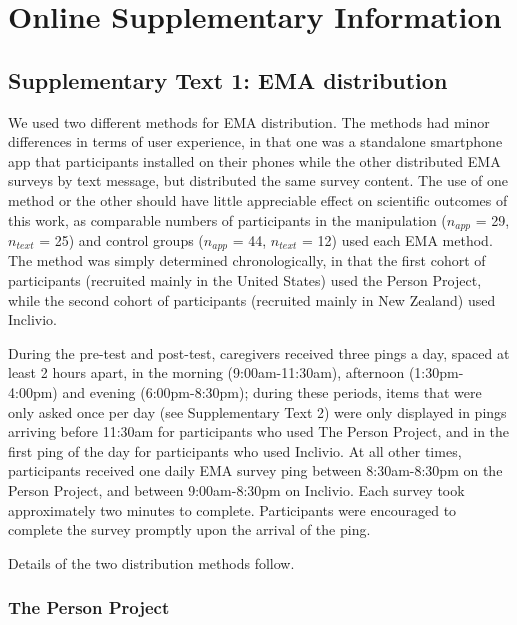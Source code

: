 \documentclass[
]{article}
\begin{document}
\newpage

\section*{Online Supplementary
Information}\label{online-supplementary-information}

\subsection*{Supplementary Text 1: EMA
distribution}\label{supplementary-text-1-ema-distribution}

We used two different methods for EMA distribution. The methods had
minor differences in terms of user experience, in that one was a
standalone smartphone app that participants installed on their phones
while the other distributed EMA surveys by text message, but distributed
the same survey content. The use of one method or the other should have
little appreciable effect on scientific outcomes of this work, as
comparable numbers of participants in the manipulation (\(n_{app}\) =
29, \(n_{text}\) = 25) and control groups (\(n_{app}\) = 44,
\(n_{text}\) = 12) used each EMA method. The method was simply
determined chronologically, in that the first cohort of participants
(recruited mainly in the United States) used the Person Project, while
the second cohort of participants (recruited mainly in New Zealand) used
Inclivio.

During the pre-test and post-test, caregivers received three pings a
day, spaced at least 2 hours apart, in the morning (9:00am-11:30am),
afternoon (1:30pm-4:00pm) and evening (6:00pm-8:30pm); during these
periods, items that were only asked once per day (see Supplementary Text
2) were only displayed in pings arriving before 11:30am for participants
who used The Person Project, and in the first ping of the day for
participants who used Inclivio. At all other times, participants
received one daily EMA survey ping between 8:30am-8:30pm on the Person
Project, and between 9:00am-8:30pm on Inclivio. Each survey took
approximately two minutes to complete. Participants were encouraged to
complete the survey promptly upon the arrival of the ping.

Details of the two distribution methods follow.

\subsubsection*{The Person Project}\label{the-person-project}
\end{document}
